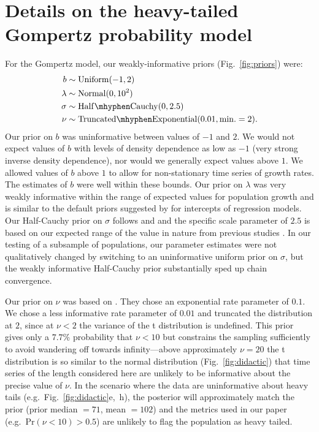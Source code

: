 \section{Details on the heavy-tailed Gompertz probability model}

For the Gompertz model, our weakly-informative priors (Fig.~\ref{fig:priors})
were:
\begin{align*}
b &\sim \mathrm{Uniform}(-1, 2)\\ \lambda &\sim \mathrm{Normal}(0, 10^2)\\
\sigma &\sim \mathrm{Half\mhyphen Cauchy} (0, 2.5)\\ \nu &\sim
\mathrm{Truncated\mhyphen Exponential}(0.01, \mathrm{min.} = 2).
\end{align*}
Our prior on $b$ was uninformative between values of $-1$ and $2$. We would
not expect values of $b$ with levels of density dependence as low as $-1$
(very strong inverse density dependence), nor would we generally expect values
above $1$. We allowed values of $b$ above $1$ to allow for non-stationary time
series of growth rates. The estimates of $b$ were well within these bounds.
Our prior on $\lambda$ was very weakly informative within the range of
expected values for population growth and is similar to the default priors
suggested by \citet{gelman2008d} for intercepts of regression models. Our
Half-Cauchy prior on $\sigma$ follows \citet{gelman2006c} and
\citet{gelman2008d} and the specific scale parameter of $2.5$ is based on our
expected range of the value in nature from previous studies
\citep[e.g.][]{connors2014}. In our testing of a subsample of populations, our
parameter estimates were not qualitatively changed by switching to an
uninformative uniform prior on $\sigma$, but the weakly informative
Half-Cauchy prior substantially sped up chain convergence.

Our prior on $\nu$ was based on \citet{fernandez1998}. They chose an
exponential rate parameter of $0.1$. We chose a less informative rate
parameter of $0.01$ and truncated the distribution at $2$, since at $\nu < 2$
the variance of the t distribution is undefined. This prior gives only a
$7.7$\% probability that $\nu < 10$ but constrains the sampling sufficiently
to avoid wandering off towards infinity---above approximately $\nu = 20$ the t
distribution is so similar to the normal distribution
(Fig.~\ref{fig:didactic}) that time series of the length considered here are
unlikely to be informative about the precise value of $\nu$. In the scenario
where the data are uninformative about heavy tails
(e.g.~Fig.~\ref{fig:didactic}e,~h), the posterior will approximately match the
prior (prior median $= 71$, mean $= 102$) and the metrics used in our paper
(e.g.~Pr$(\nu < 10) > 0.5$) are unlikely to flag the population as heavy
tailed.

